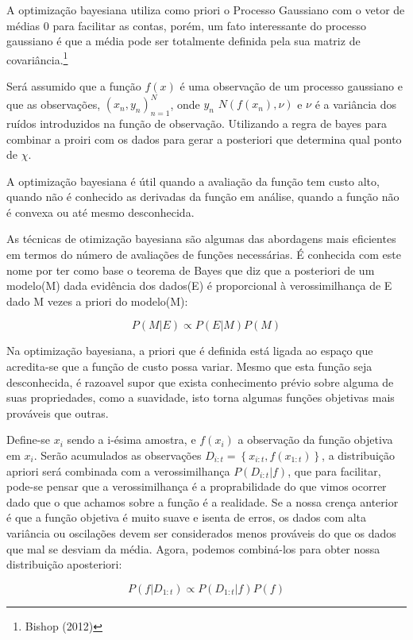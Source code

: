 \documentclass[
	12pt,				%
	a4paper,		%
	oneside,    %
	chapter=TITLE,		   %
	section=TITLE,		   %
	subsection=TITLE,	   %
	subsubsection=TITLE, %
	english,			%
	french,				%
	spanish,			%
	brazil,				%
]{abntex2}
\begin{document}
A optimização bayesiana utiliza como priori o Processo Gaussiano com o
vetor de médias 0 para facilitar as contas, porém, um fato interessante
do processo gaussiano é que a média pode ser totalmente definida pela
sua matriz de covariância.\footnote{Bishop (2012)}

Será assumido que a função \(f(x)\) é uma observação de um processo
gaussiano e que as observações, \((x_n,y_n)_{n=1}^N\), onde
\(y_n \mbox{~} N(f(x_n),\nu)\) e \(\nu\) é a variância dos ruídos
introduzidos na função de observação. Utilizando a regra de bayes para
combinar a proiri com os dados para gerar a posteriori que determina
qual ponto de \(\chi\).

A optimização bayesiana é útil quando a avaliação da função tem custo
alto, quando não é conhecido as derivadas da função em análise, quando a
função não é convexa ou até mesmo desconhecida.

As técnicas de otimização bayesiana são algumas das abordagens mais
eficientes em termos do número de avaliações de funções necessárias. É
conhecida com este nome por ter como base o teorema de Bayes que diz que
a posteriori de um modelo(M) dada evidência dos dados(E) é proporcional
à verossimilhança de E dado M vezes a priori do modelo(M):

\[
P(M|E) \propto P(E|M)P(M)
\]

Na optimização bayesiana, a priori que é definida está ligada ao espaço
que acredita-se que a função de custo possa variar. Mesmo que esta
função seja desconhecida, é razoavel supor que exista conhecimento
prévio sobre alguma de suas propriedades, como a suavidade, isto torna
algumas funções objetivas mais prováveis que outras.

Define-se \(x_i\) sendo a i-ésima amostra, e \(f(x_i)\) a observação da
função objetiva em \(x_i\). Serão acumulados as observações
\(D_{i:t}=\left\{ x_{i:t},f(x_{1:t}) \right\}\), a distribuição apriori
será combinada com a verossimilhança \(P(D_{i:t}|f)\), que para
facilitar, pode-se pensar que a verossimilhança é a proprabilidade do
que vimos ocorrer dado que o que achamos sobre a função é a realidade.
Se a nossa crença anterior é que a função objetiva é muito suave e
isenta de erros, os dados com alta variância ou oscilações devem ser
considerados menos prováveis do que os dados que mal se desviam da
média. Agora, podemos combiná-los para obter nossa distribuição
aposteriori:

\[
P(f|D_{1:t}) \propto P(D_{1:t}|f)P(f)
\]
\end{document}
